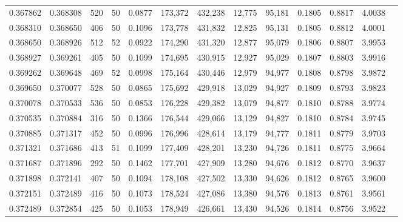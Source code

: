 \begin{tabular}{rrrrrrrrrrrrr}
0.367862 & 0.368308 &   520 &  50 &                                     0.0877 & 173,372 & 432,238 &  12,775 &  95,181 & 0.1805 & 0.8817 & 4.0038 \\
0.368310 & 0.368650 &   406 &  50 &                                     0.1096 & 173,778 & 431,832 &  12,825 &  95,131 & 0.1805 & 0.8812 & 4.0001 \\
0.368650 & 0.368926 &   512 &  52 &                                     0.0922 & 174,290 & 431,320 &  12,877 &  95,079 & 0.1806 & 0.8807 & 3.9953 \\
0.368927 & 0.369261 &   405 &  50 &                                     0.1099 & 174,695 & 430,915 &  12,927 &  95,029 & 0.1807 & 0.8803 & 3.9916 \\
0.369262 & 0.369648 &   469 &  52 &                                     0.0998 & 175,164 & 430,446 &  12,979 &  94,977 & 0.1808 & 0.8798 & 3.9872 \\
0.369650 & 0.370077 &   528 &  50 &                                     0.0865 & 175,692 & 429,918 &  13,029 &  94,927 & 0.1809 & 0.8793 & 3.9823 \\
0.370078 & 0.370533 &   536 &  50 &                                     0.0853 & 176,228 & 429,382 &  13,079 &  94,877 & 0.1810 & 0.8788 & 3.9774 \\
0.370535 & 0.370884 &   316 &  50 &                                     0.1366 & 176,544 & 429,066 &  13,129 &  94,827 & 0.1810 & 0.8784 & 3.9745 \\
0.370885 & 0.371317 &   452 &  50 &                                     0.0996 & 176,996 & 428,614 &  13,179 &  94,777 & 0.1811 & 0.8779 & 3.9703 \\
0.371321 & 0.371686 &   413 &  51 &                                     0.1099 & 177,409 & 428,201 &  13,230 &  94,726 & 0.1811 & 0.8775 & 3.9664 \\
0.371687 & 0.371896 &   292 &  50 &                                     0.1462 & 177,701 & 427,909 &  13,280 &  94,676 & 0.1812 & 0.8770 & 3.9637 \\
0.371898 & 0.372141 &   407 &  50 &                                     0.1094 & 178,108 & 427,502 &  13,330 &  94,626 & 0.1812 & 0.8765 & 3.9600 \\
0.372151 & 0.372489 &   416 &  50 &                                     0.1073 & 178,524 & 427,086 &  13,380 &  94,576 & 0.1813 & 0.8761 & 3.9561 \\
0.372489 & 0.372854 &   425 &  50 &                                     0.1053 & 178,949 & 426,661 &  13,430 &  94,526 & 0.1814 & 0.8756 & 3.9522 \\

\end{tabular}
